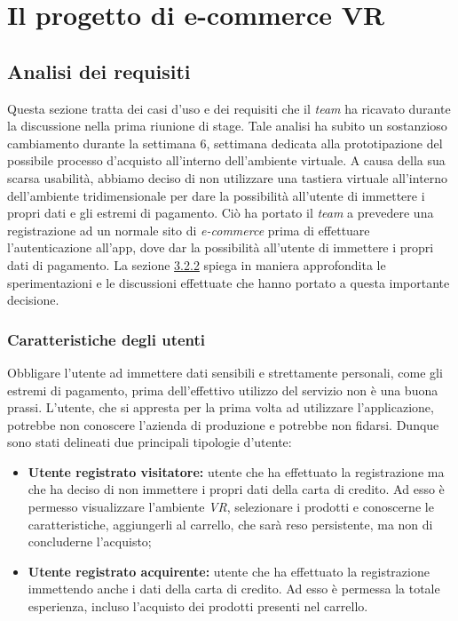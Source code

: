 \chapter{Il progetto di e-commerce VR}
\label{cap:ilprogettoe-commercevr}

\section{Analisi dei requisiti}

Questa sezione tratta dei casi d'uso e dei requisiti che il \textit{team} ha ricavato durante la discussione nella prima riunione di stage. Tale analisi ha subito un sostanzioso cambiamento durante la settimana 6, settimana dedicata alla prototipazione del possibile processo d'acquisto all'interno dell'ambiente virtuale. A causa della sua scarsa usabilità, abbiamo deciso di non utilizzare una tastiera virtuale all'interno dell'ambiente tridimensionale per dare la possibilità all'utente di immettere i propri dati e gli estremi di pagamento. Ciò ha portato il \textit{team} a prevedere una registrazione ad un normale sito di \textit{e-commerce} prima di effettuare l'autenticazione all'app, dove dar la possibilità all'utente di immettere i propri dati di pagamento. La sezione \hyperlink{3.2.2}{3.2.2} spiega in maniera approfondita le sperimentazioni e le discussioni effettuate che hanno portato a questa importante decisione. 


\subsection{Caratteristiche degli utenti}

Obbligare l'utente ad immettere dati sensibili e strettamente personali, come gli estremi di pagamento, prima dell'effettivo utilizzo del servizio non è una buona prassi. L'utente, che si appresta per la prima volta ad utilizzare l'applicazione, potrebbe non conoscere l'azienda di produzione e potrebbe non fidarsi. Dunque sono stati delineati due principali tipologie d'utente:

\begin{itemize}
	\item \textbf{Utente registrato visitatore:} utente che ha effettuato la registrazione ma che ha deciso di non immettere i propri dati della carta di credito. Ad esso è permesso visualizzare l'ambiente \textit{VR}, selezionare i prodotti e conoscerne le caratteristiche, aggiungerli al carrello, che sarà reso persistente, ma non di concluderne l'acquisto;
	\item \textbf{Utente registrato acquirente:} utente che ha effettuato la registrazione immettendo anche i dati della carta di credito. Ad esso è permessa la totale esperienza, incluso l'acquisto dei prodotti presenti nel carrello.
\end{itemize}

